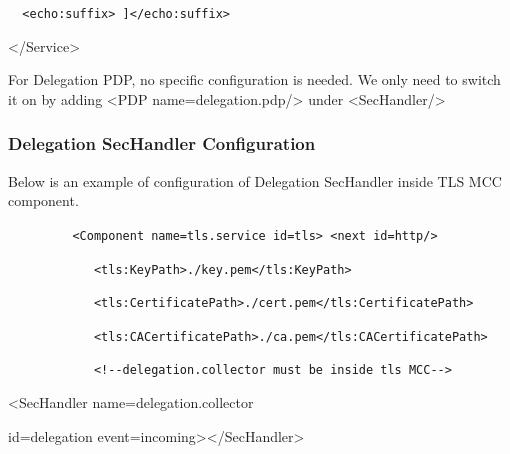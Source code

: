 \documentclass{article}
\begin{document}
{\upshape\color{black}
\foreignlanguage{spanish}{\texttt{\ \ }}\foreignlanguage{spanish}{\texttt{{\textless}echo:suffix{\textgreater}
]{\textless}/echo:suffix{\textgreater}}}}

{\ttfamily\color{black}
{\textless}/Service{\textgreater}}

{\upshape\color{black}
For Delegation PDP, no specific configuration is needed. We only need to
switch it on by adding {\textless}PDP
name={\textquotedbl}delegation.pdp{\textquotedbl}/{\textgreater} under
{\textless}SecHandler/{\textgreater}}

\subsubsection[Delegation SecHandler Configuration]{Delegation
SecHandler Configuration}
{\upshape\color{black}
Below is an example of configuration of Delegation SecHandler inside TLS
MCC component.}

{\upshape\color{black}
\texttt{\ \ \ \ \ \ \ \ \ {\textless}Component
name={\textquotedbl}tls.service{\textquotedbl}
id={\textquotedbl}tls{\textquotedbl}{\textgreater} {\textless}next
id={\textquotedbl}http{\textquotedbl}/{\textgreater}}}

{\upshape\color{black}
\texttt{\ \ \ \ \ \ \ \ \ \ \ \ {\textless}tls:KeyPath{\textgreater}./key.pem{\textless}/tls:KeyPath{\textgreater}}}

{\upshape\color{black}
\texttt{\ \ \ \ \ \ \ \ \ \ \ \ {\textless}tls:CertificatePath{\textgreater}./cert.pem{\textless}/tls:CertificatePath{\textgreater}}}

{\upshape\color{black}
\texttt{\ \ \ \ \ \ \ \ \ \ \ \ {\textless}tls:CACertificatePath{\textgreater}./ca.pem{\textless}/tls:CACertificatePath{\textgreater}}}

{\upshape\color{black}
\texttt{\ \ \ \ \ \ \ \ \ \ \ \ {\textless}!-{}-delegation.collector
must be inside tls MCC-{}-{\textgreater}}}

{\ttfamily\color{black}
{\textless}SecHandler
name={\textquotedbl}delegation.collector{\textquotedbl} }

{\ttfamily\color{black}
id={\textquotedbl}delegation{\textquotedbl}
event={\textquotedbl}incoming{\textquotedbl}{\textgreater}{\textless}/SecHandler{\textgreater}}
\end{document}
